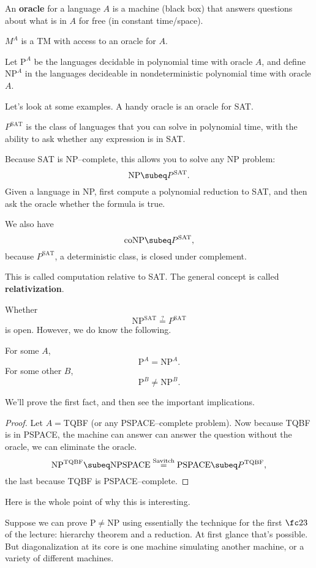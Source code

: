\begin{df}
An \textbf{oracle} for a language $A$ is a machine (black box) that answers questions about what is in $A$ for free (in constant time/space). %

$M^A$ is a TM with access to an oracle for $A$.

Let $\text{P}^A$ be the languages decidable in polynomial time with oracle $A$, and define $\text{NP}^A$ in the languages decideable in nondeterministic polynomial time with oracle $A$.
\end{df}
Let's look at some examples. A handy oracle is an oracle for SAT.
\begin{ex}
$P^{\text{SAT}}$ is the class of languages that you can solve in polynomial time, with the ability to ask whether any expression is in SAT.

Because SAT is NP--complete, this allows you to solve any NP problem:
\[
\text{NP}\subeq P^{\text{SAT}}.
\]
Given a language in NP, first compute a polynomial reduction to SAT, and then ask the oracle whether the formula is true.

We also have
\[
\text{coNP}\subeq P^{\text{SAT}},
\]
because $P^{\text{SAT}}$, a deterministic class, is closed under complement.

This is called computation relative to SAT. The general concept is called \textbf{relativization}.

Whether
\[
\text{NP}^{\text{SAT}}\stackrel{?}{=} P^{\text{SAT}}
\]
is open. However, we do know the following.
\end{ex}
\begin{thm}
For some $A$,
\[
\text{P}^A=\text{NP}^A.
\]
For some other $B$,
\[
\text{P}^B\ne \text{NP}^B.
\]
\end{thm}
We'll prove the first fact, and then see the important implications.
\begin{proof}
Let $A=$TQBF (or any PSPACE--complete problem). Now because TQBF is in PSPACE, the machine can answer can answer the question without the oracle, we can eliminate  the oracle. 
\[
\text{NP}^{\text{TQBF}}\subeq \text{NPSPACE}\stackrel{\text{Savitch}}=\text{PSPACE}\subeq P^{\text{TQBF}},
\]
the last because TQBF is PSPACE--complete. 
\end{proof}
Here is the whole point of why this is interesting.

Suppose we can prove P$\ne$NP using essentially the technique for the first $\fc 23$ of the lecture: hierarchy theorem and a reduction. At first glance that's possible. But diagonalization at its core is one machine simulating another machine, or a variety of different machines. %

